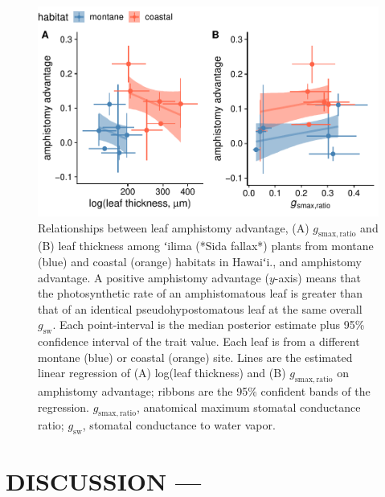 \documentclass[
  letterpaper,
  DIV=11,
  numbers=noendperiod]{scrartcl}
\begin{document}
\begin{figure}[H]
  \includegraphics{../figures/traits-aa.pdf}
  \caption{Relationships between leaf amphistomy advantage, (A) $g_\mathrm{smax,ratio}$ and (B) leaf thickness among ʻilima (*Sida fallax*) plants from montane (blue) and coastal (orange) habitats in Hawaiʻi., and amphistomy advantage. A positive amphistomy advantage ($y$-axis) means that the photosynthetic rate of an amphistomatous leaf is greater than that of an identical pseudohypostomatous leaf at the same overall $g_\mathrm{sw}$. Each point-interval is the median posterior estimate plus 95\% confidence interval of the trait value. Each leaf is from a different montane (blue) or coastal (orange) site. Lines are the estimated linear regression of (A) log(leaf thickness) and (B) $g_\mathrm{smax,ratio}$ on amphistomy advantage; ribbons are the 95\% confident bands of the regression. $g_\mathrm{smax,ratio}$, anatomical maximum stomatal conductance ratio; $g_\mathrm{sw}$, stomatal conductance to water vapor.}
  \label{fig:traits-aa}
\end{figure}

\hypertarget{discussion}{%
\section{DISCUSSION ---}\label{discussion}}
\end{document}
